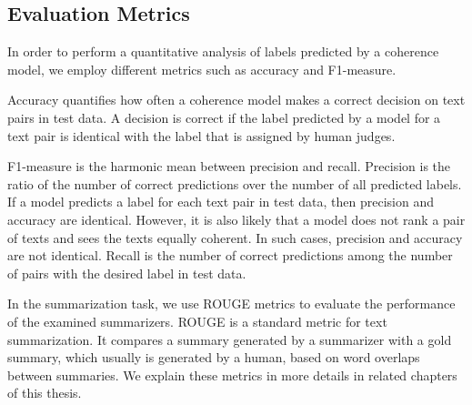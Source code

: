 \subsection{Evaluation Metrics}

In order to perform a quantitative analysis of labels predicted by a coherence model, we employ different metrics such as accuracy and F1-measure. 

Accuracy quantifies how often a coherence model makes a correct decision on text pairs in test data.
A decision is correct if the label predicted by a model for a text pair is identical with the label that is assigned by human judges.

F1-measure is the harmonic mean between precision and recall. 
Precision is the ratio of the number of correct predictions over the number of all predicted labels. 
If a model predicts a label for each text pair in test data, then precision and accuracy are identical. 
However, it is also likely that a model does not rank a pair of texts and sees the texts equally coherent.  
In such cases, precision and accuracy are not identical.    
Recall is the number of correct predictions among the number of pairs with the desired label in test data. 

In the summarization task, we use ROUGE metrics to evaluate the performance of the examined summarizers. 
ROUGE is a standard metric for text summarization. It compares a summary generated by a summarizer with a gold summary, which usually is generated by a human, based on word overlaps between summaries. 
We explain these metrics in more details in related chapters of this thesis. 